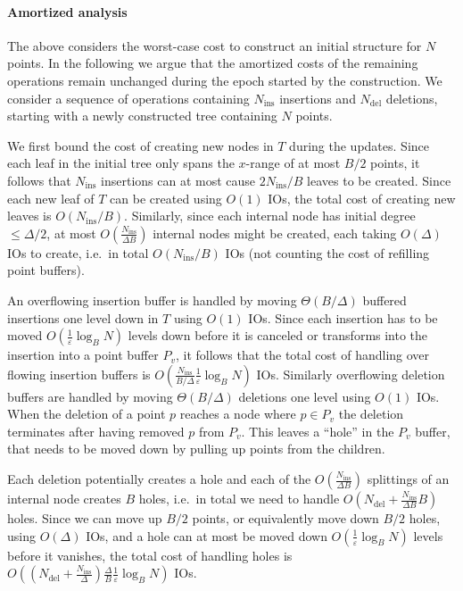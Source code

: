 \documentclass[11pt]{article}
\newcommand{\Ni}{N_{\mathrm{ins}}}
\newcommand{\Nd}{N_{\mathrm{del}}}
\begin{document}
\paragraph*{Amortized analysis} 

The above considers the worst-case cost to construct an initial
structure for $N$ points. In the following we argue that the amortized
costs of the remaining operations remain unchanged during the epoch
started by the construction.  We consider a sequence of operations
containing $\Ni$ insertions and $\Nd$ deletions, starting with a newly
constructed tree containing $N$ points.

We first bound the cost of creating new nodes in $T$ during the
updates. Since each leaf in the initial tree only spans the $x$-range
of at most $B/2$ points, it follows that $\Ni$ insertions can at most
cause $2\Ni/B$ leaves to be created. Since each new leaf of $T$ can be
created using $O(1)$ IOs, the total cost of creating new leaves is
$O(\Ni/B)$. Similarly, since each internal node has initial degree
$\leq \Delta/2$, at most $O(\frac{\Ni}{\Delta B})$ internal nodes
might be created, each taking $O(\Delta)$ IOs to create, i.e.\ in
total $O(\Ni/B)$ IOs (not counting the cost of refilling point
buffers).

An overflowing insertion buffer is handled by moving
$\Theta(B/\Delta)$ buffered insertions one level down in $T$ using
$O(1)$ IOs. Since each insertion has to be moved
$O(\frac{1}{\varepsilon}\log_B N)$ levels down before it is canceled
or transforms into the insertion into a point buffer $P_v$, it follows
that the total cost of handling over flowing insertion buffers is
$O(\frac{\Ni}{B/\Delta}\frac{1}{\varepsilon}\log_B N)$ IOs. Similarly
overflowing deletion buffers are handled by moving $\Theta(B/\Delta)$
deletions one level using $O(1)$ IOs. When the deletion of a point $p$
reaches a node where $p\in P_v$ the deletion terminates after having
removed $p$ from $P_v$. This leaves a ``hole'' in the $P_v$ buffer,
that needs to be moved down by pulling up points from the children.

Each deletion potentially creates a hole and each of the
$O(\frac{\Ni}{\Delta B})$ splittings of an internal node creates $B$
holes, i.e.\ in total we need to handle $O(\Nd+\frac{\Ni}{\Delta B}B)$
holes. Since we can move up $B/2$ points, or equivalently move down
$B/2$ holes, using $O(\Delta)$ IOs, and a hole can at most be moved
down $O(\frac{1}{\varepsilon}\log_B N)$ levels before it vanishes, the
total cost of handling holes is
$O((\Nd+\frac{\Ni}{\Delta})\frac{\Delta}{B}\frac{1}{\varepsilon}\log_B
N)$ IOs.
\end{document}
